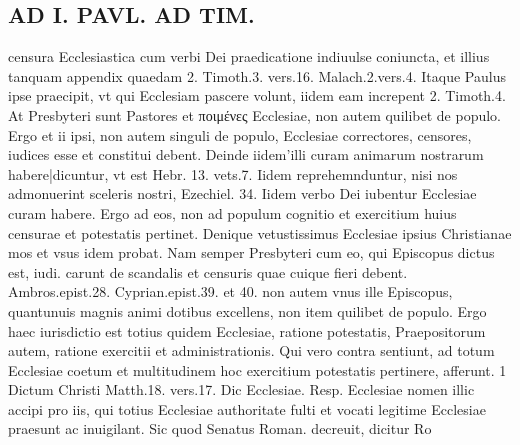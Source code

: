 \documentclass{article}
\begin{document}
\begin{pages}
\section*{AD I. PAVL. AD TIM. }
\marginpar{[ p.446 ]}\pstart censura Ecclesiastica cum verbi Dei praedicatione indiuulse coniuncta, et illius tanquam appendix quaedam 2. Timoth.3. vers.16. Malach.2.vers.4. Itaque Paulus ipse praecipit, vt qui Ecclesiam pascere volunt, iidem eam increpent 2. Timoth.4. At Presbyteri sunt Pastores et ποιμένες Ecclesiae, non autem quilibet de populo. Ergo et ii ipsi, non autem singuli de populo, Ecclesiae correctores, censores, iudices esse et constitui debent. Deinde iidem’illi curam animarum nostrarum habere|dicuntur, vt est Hebr. 13. vets.7. Iidem reprehemnduntur, nisi nos admonuerint sceleris nostri, Ezechiel. 34. Iidem verbo Dei iubentur Ecclesiae curam habere. Ergo ad eos, non ad populum cognitio et exercitium huius censurae et potestatis pertinet. Denique vetustissimus Ecclesiae ipsius Christianae mos et vsus idem probat. Nam semper Presbyteri cum eo, qui Episcopus dictus est, iudi. carunt de scandalis et censuris quae cuique fieri debent. Ambros.epist.28. Cyprian.epist.39. et 40. non autem vnus ille Episcopus, quantunuis magnis animi dotibus excellens, non item quilibet de populo. Ergo haec iurisdictio est totius quidem Ecclesiae, ratione potestatis, Praepositorum autem, ratione exercitii et administrationis. Qui vero contra sentiunt, ad totum Ecclesiae coetum et multitudinem hoc exercitium potestatis pertinere, afferunt. 1 Dictum Christi Matth.18. vers.17. Dic Ecclesiae. Resp. Ecclesiae nomen illic accipi pro iis, qui totius Ecclesiae authoritate fulti et vocati legitime Ecclesiae praesunt ac inuigilant. Sic quod Senatus Roman. decreuit, dicitur Ro\pend

\end{pages}
\end{document}
